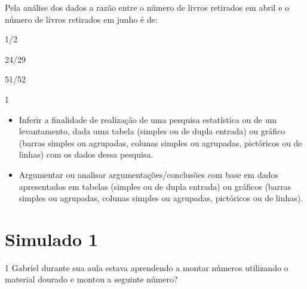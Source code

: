 Pela análise dos dados a razão entre o número de livros retirados em
abril e o número de livros retirados em junho é de:

\begin{escolha}
\item
  1/2
\item
  24/29
\item
  51/52
\item
  1
\end{escolha}


\begin{itemize}
\item Inferir a finalidade de realização de uma pesquisa estatística ou de
um levantamento, dada uma tabela (simples ou de dupla entrada) ou
gráfico (barras simples ou agrupadas, colunas simples ou agrupadas,
pictóricos ou de linhas) com os dados dessa pesquisa.

\item Argumentar ou analisar argumentações/conclusões com base em dados
apresentados em tabelas (simples ou de dupla entrada) ou gráficos
(barras simples ou agrupadas, colunas simples ou agrupadas, pictóricos
ou de linhas).
\end{itemize}



\chapter{Simulado 1}

\num{1} Gabriel durante sua aula estava aprendendo a montar números
utilizando o material dourado e montou a seguinte número?

